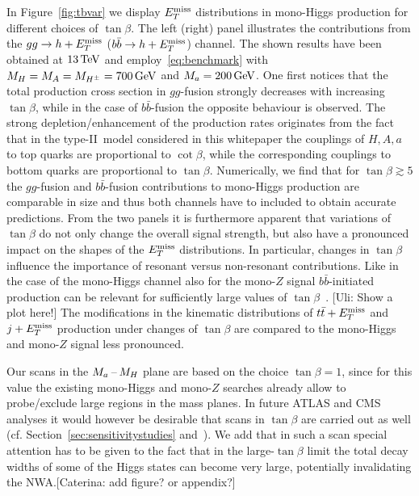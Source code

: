 In Figure~\ref{fig:tbvar} we display $E_T^\mathrm{miss}$ distributions in mono-Higgs production for different choices of $\tan \beta$. The left (right) panel illustrates the contributions from the $gg \to h + E_T^\mathrm{miss}$ ($b \bar b \to h + E_T^\mathrm{miss}$) channel. The shown results have been obtained at $13 \, {\rm TeV}$ and employ~\eqref{eq:benchmark} with $M_{H} = M_{A} = M_{H^{\pm}} = 700 \, {\rm GeV}$ and $M_{a} = 200 \, {\rm GeV}$. One first notices that the total production cross section in $gg$-fusion strongly decreases with increasing $\tan \beta$, while in the case of $b \bar b$-fusion the opposite behaviour is observed. The strong depletion/enhancement of the production rates originates from the fact that in  the type-II~\hdma model considered in this whitepaper the couplings of $H,A,a$ to top quarks are proportional to $\cot \beta$, while the corresponding couplings to bottom quarks are proportional to $\tan \beta$. Numerically, we find that for $\tan \beta \gtrsim 5$ the $gg$-fusion and $b\bar b$-fusion contributions to mono-Higgs production are comparable in size and thus both channels have to included to obtain accurate predictions. From the two panels it is furthermore apparent that variations of $\tan \beta$ do not only change the overall signal strength, but also have a pronounced impact on the shapes of the $E_T^\mathrm{miss}$ distributions. In particular, changes in $\tan \beta$ influence the importance of resonant versus non-resonant contributions. Like in the case of the mono-Higgs channel also for the mono-$Z$ signal $b \bar b$-initiated production can be relevant for sufficiently large values of $\tan \beta$~\cite{Bauer:2017ota}. {\color{red} [Uli: Show a plot here!]} The modifications in the kinematic distributions of $t \bar t + E_T^\mathrm{miss}$ and $j +E_T^\mathrm{miss}$ production under changes of $\tan \beta$ are compared to the mono-Higgs and mono-$Z$ signal less pronounced. 

Our  scans in the $M_{a}\hspace{0.5mm}$--$\hspace{0.5mm} M_H$ plane are based on the choice $\tan \beta = 1$, since for this value the existing mono-Higgs and mono-$Z$ searches already allow to probe/exclude large regions in the mass planes. In  future ATLAS and CMS analyses it would however be desirable that scans in $\tan \beta$ are carried out as well (cf. Section~\ref{sec:sensitivitystudies} and~\cite{No:2015xqa,Bauer:2017ota,Pani:2017qyd}). We add that in such a scan special attention has to be given to the fact that in the large-$\tan \beta$ limit the total decay widths of some of the Higgs states can become very large, potentially invalidating the NWA.\color{red}[Caterina: add figure? or appendix?]\color{black}

